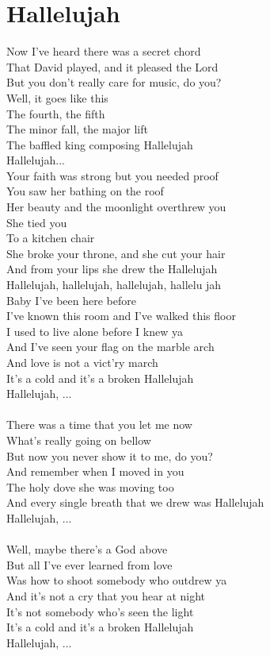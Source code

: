 \section{Hallelujah}
Now I've heard there was a secret chord\\
That David played, and it pleased the Lord\\
But you don't really care for music, do you?\\
Well, it goes like this\\
The fourth, the fifth\\
The minor fall, the major lift\\
The baffled king composing Hallelujah\\
Hallelujah...
\\
Your faith was strong but you needed proof\\
You saw her bathing on the roof\\
Her beauty and the moonlight overthrew you\\
She tied you\\
To a kitchen chair\\
She broke your throne, and she cut your hair\\
And from your lips she drew the Hallelujah\\

Hallelujah, hallelujah, hallelujah, hallelu  jah
\\
Baby I've been here before\\
I've known this room and I've walked this floor\\
I used to live alone before I knew ya\\
And I've seen your flag on the marble arch\\
And love is not a vict'ry march\\
It's a cold and it's a broken Hallelujah\\
Hallelujah, ...\\
\\
There was a time that you let me now\\
What's really going on bellow\\
But now you never show it to me, do you?\\
And remember when I moved in you\\
The holy dove she was moving too\\
And every single breath that we drew was Hallelujah\\
Hallelujah, ...\\
\\
Well, maybe there’s a God above\\
But all I’ve ever learned from love\\
Was how to shoot somebody who outdrew ya\\
And it’s not a cry that you hear at night\\
It’s not somebody who's seen the light\\
It’s a cold and it’s a broken Hallelujah\\
Hallelujah, ...